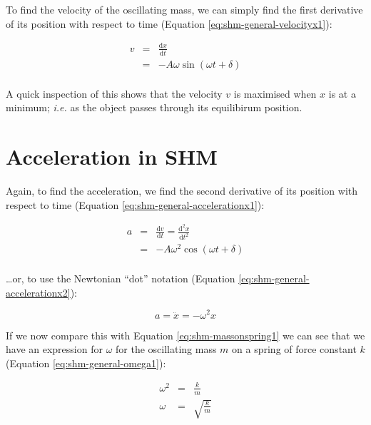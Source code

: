 \documentclass[
]{book}
\begin{document}
To find the velocity of the oscillating mass, we can simply find the first derivative of its position with respect to time (Equation \eqref{eq:shm-general-velocityx1}):

\begin{equation}
\begin{array}{rcl}
v & = & \frac{\textrm{d}x}{\textrm{d}t}\\
&=& -A \omega \sin (\omega t + \delta)\\
\end{array}
\label{eq:shm-general-velocityx1}
\end{equation}

A quick inspection of this shows that the velocity \(v\) is maximised when \(x\) is at a minimum; \emph{i.e.} as the object passes through its equilibirum position.

\hypertarget{sec:shm-acceleration}{%
\section{Acceleration in SHM}\label{sec:shm-acceleration}}

Again, to find the acceleration, we find the second derivative of its position with respect to time (Equation \eqref{eq:shm-general-accelerationx1}):

\begin{equation}
\begin{array}{rcl}
a & = & \frac{\textrm{d}v}{\textrm{d}t} = \frac{\textrm{d}^2 x}{\textrm{d}t^2}\\
&=& -A \omega^2 \cos (\omega t + \delta)\\
\end{array}
\label{eq:shm-general-accelerationx1}
\end{equation}

\ldots or, to use the Newtonian ``dot'' notation (Equation \eqref{eq:shm-general-accelerationx2}):

\begin{equation}
a = \ddot{x} = -\omega^2 x
\label{eq:shm-general-accelerationx2}
\end{equation}

If we now compare this with Equation \eqref{eq:shm-massonspring1} we can see that we have an expression for \(\omega\) for the oscillating mass \(m\) on a spring of force constant \(k\) (Equation \eqref{eq:shm-general-omega1}):

\begin{equation}
\begin{array}{rcl}
\omega^2 &=& \frac{k}{m}\\
\omega &=& \sqrt{\frac{k}{m}}
\end{array}
\label{eq:shm-general-omega1}
\end{equation}
\end{document}
